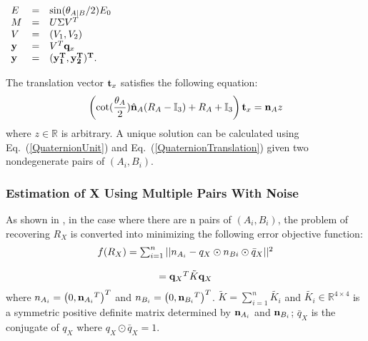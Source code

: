 \documentclass[twocolumn,10pt]{asme2ej}
\newcommand{\nn}{{\bf n}}
\newcommand{\ttt}{{\bf t}}
\newcommand{\qq}{{\bf q}}
\begin{document}
\begin{center}
$\begin{array}{lcl}
E & = & \sin(\theta_{A|B}/2)E_0\\
M & = & U\Sigma V^{T}\\
V & = & (V_{1}, V_{2})\\
\bf y & = & V^{T}\qq_{x}\\
\bf y & = & (\bf y^{T}_{1},\bf y^{T}_{2} )^{T}.
\end{array}$
\end{center}
The translation vector $\ttt_{x}$ satisfies the following equation:
\begin{equation}
\left(\cot(\dfrac{\theta_{A}}{2})\hat{\nn}_{A}(R_{A}-\mathbb{I}_{3})+ R_{A} + \mathbb{I}_{3}\right)\ttt_{x} = \nn_{A}z
\label{QuaternionTranslation} 
\end{equation}
where $z \in \mathbb{R}$ is arbitrary. A unique solution can be calculated using Eq.~(\ref{QuaternionUnit}) and Eq.~(\ref{QuaternionTranslation}) given two nondegenerate pairs of $(A_{i}, B_{i})$.

\subsubsection{Estimation of X Using Multiple Pairs With Noise}
As shown in \cite{horaud1995hand}, in the case where there are n pairs of $(A_{i}, B_{i})$, the problem of recovering $R_{X}$ is converted into minimizing the following error objective function:
\begin{equation}
\begin{array}{c}
f(R_{X})
= \sum_{i = 1}^{n}||{n_{A_{i}} - q_{X} \odot n_{B{i}} \odot \bar{q}_{X}}||^{2} \\
\\ 
= {\qq_{X}}^{T}\tilde{K}{\qq_{X}}
\end{array}
\label{ErrorQuaternion} 
\end{equation}
where $n_{A_{i}} = \left(0, {\nn_{A_{i}}}^{T}\right)^{T}$ and $n_{B_{i}} = \left(0, {\nn_{B_{i}}}^{T}\right)^{T}$. $\tilde{K} = \sum_{i = 1}^{n}\tilde{K_{i}}$ and $\tilde{K_{i}} \in \mathbb{R}^{4 \times 4}$ is a symmetric positive definite matrix determined by $\nn_{A_{i}}$ and $\nn_{B_{i}}$; $\bar{q}_{X}$ is the conjugate of ${q}_{X}$ where $q_{X} \odot \bar{q}_{X} = 1$.
\end{document}
